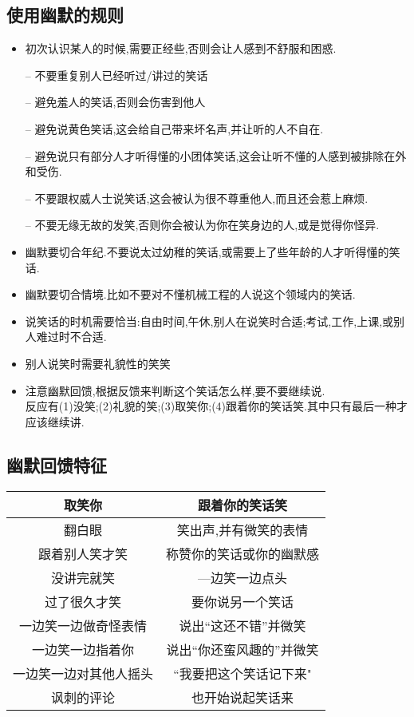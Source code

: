 \documentclass[UTF8]{article}
\newcommand{\indList}{\vspace{-6pt}}
\newcommand{\dash}{–}
\begin{document}
\subsection{使用幽默的规则}
\begin{itemize}
    \item 初次认识某人的时候,需要正经些,否则会让人感到不舒服和困惑.
    \item[\dash] 不要重复别人已经听过/讲过的笑话
    \item[\dash] 避免羞人的笑话,否则会伤害到他人
    \item[\dash] 避免说黄色笑话,这会给自己带来坏名声,并让听的人不自在.
    \item[\dash] 避免说只有部分人才听得懂的小团体笑话,这会让听不懂的人感到被排除在外和受伤.
    \item[\dash] 不要跟权威人士说笑话,这会被认为很不尊重他人,而且还会惹上麻烦.
    \item[\dash] 不要无缘无故的发笑,否则你会被认为你在笑身边的人,或是觉得你怪异.
    \item 幽默要切合年纪.不要说太过幼稚的笑话,或需要上了些年龄的人才听得懂的笑话.
    \item 幽默要切合情境.比如不要对不懂机械工程的人说这个领域内的笑话.
    \item 说笑话的时机需要恰当:自由时间,午休,别人在说笑时合适;考试,工作,上课,或别人难过时不合适.
    \item 别人说笑时需要礼貌性的笑笑
    \item 注意幽默回馈,根据反馈来判断这个笑话怎么样,要不要继续说.\\ 反应有(1)没笑;(2)礼貌的笑;(3)取笑你;(4)跟着你的笑话笑.其中只有最后一种才应该继续讲.
\end{itemize}

\subsection{幽默回馈特征}
\indList
\begin{center}
\begin{tabular}{c|c}
\textbf{取笑你}&\textbf{跟着你的笑话笑}\\ \hline
翻白眼&笑出声,并有微笑的表情\\ 
跟着别人笑才笑&称赞你的笑话或你的幽默感\\ 
没讲完就笑&—边笑一边点头\\ 
过了很久才笑&要你说另一个笑话\\ 
一边笑一边做奇怪表情&说出``这还不错''并微笑\\ 
一边笑一边指着你&说出``你还蛮风趣的''并微笑\\ 
一边笑一边对其他人摇头&``我要把这个笑话记下来"\\ 
讽刺的评论&也开始说起笑话来\\ 
\end{tabular}
\end{center}
\indList
\end{document}
